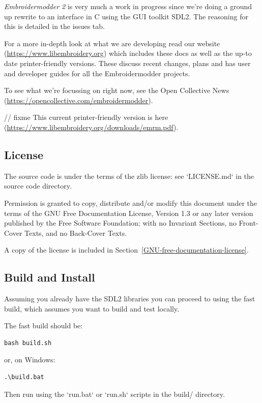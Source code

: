 \documentclass[a4paper]{report}
\begin{document}
\emph{Embroidermodder 2} is very much a work in progress since we're doing a ground
up rewrite to an interface in C using the GUI toolkit SDL2.
The reasoning for this is detailed in the issues tab.

For a more in-depth look at what we are developing read our
website (\url{https://www.libembroidery.org}) which includes these docs as well
as the up-to date printer-friendly versions. These discuss recent changes,
plans and has user and developer guides for all the Embroidermodder projects.

To see what we're focussing on right now, see the Open Collective
News (\url{https://opencollective.com/embroidermodder}).

// fixme
This current printer-friendly version
is here (\url{https://www.libembroidery.org/downloads/emrm.pdf}).

\subsection{License}

The source code is under the terms of the zlib license: see `LICENSE.md`
in the source code directory.

Permission is granted to copy, distribute and/or modify this document
under the terms of the GNU Free Documentation License, Version 1.3
or any later version published by the Free Software Foundation;
with no Invariant Sections, no Front-Cover Texts, and no Back-Cover Texts.

A copy of the license is included in Section~\ref{GNU-free-documentation-license}.

\subsection{Build and Install}

Assuming you already have the SDL2 libraries you can proceed to using the fast build, which
assumes you want to build and test locally.

The fast build should be:

\begin{verbatim}
bash build.sh
\end{verbatim}

or, on Windows:

\begin{verbatim}
.\build.bat
\end{verbatim}

Then run using the `run.bat` or `run.sh` scripts in the build/ directory.
\end{document}
